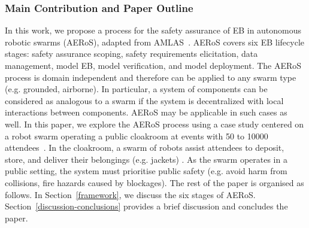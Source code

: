 \documentclass[runningheads]{llncs}
\begin{document}
\subsubsection{Main Contribution and Paper Outline} In this work, we propose a process for the safety assurance of EB in autonomous robotic swarms (AERoS), adapted from AMLAS~\cite{Hawkins2021}. 
AERoS covers six EB lifecycle stages: safety assurance scoping, safety requirements elicitation, data management, model EB, model verification, and  model deployment. 
The AERoS process is domain independent and therefore can be applied to any swarm type (e.g. grounded, airborne). 
In particular, a system of components can be considered as analogous to a swarm if the system is decentralized with local interactions between components. 
AERoS may be applicable in such cases as well. %
In this paper, we explore the AERoS process using a case study centered on a robot swarm operating a public cloakroom at events with 50 to 10000 attendees~\cite{Jones2020}. 
In the cloakroom, a swarm of robots assist attendees to deposit, store, and deliver their belongings (e.g. jackets) \cite{Jones2020}. 
As the swarm operates in a public setting, the system must prioritise public safety (e.g. avoid harm from collisions, fire hazards caused by blockages). 
The rest of the paper is organised as follows. 
In Section~\ref{framework}, we discuss the six stages of AERoS. Section~\ref{discussion-conclusions} provides a brief discussion and concludes the paper. 
\end{document}
